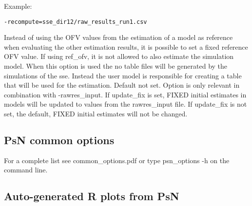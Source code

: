 \begin{optionlist}
Example:
\begin{verbatim}
-recompute=sse_dir12/raw_results_run1.csv
\end{verbatim}
\nextopt
{}
Instead of using the OFV values from the estimation of a model as reference when evaluating the other estimation results, it is possible to set a fixed reference OFV value. If using ref\_ofv, it is not allowed to also estimate the simulation model.
\nextopt
{}
When this option is used the no table files will be generated by
the simulations of the sse. Instead the user model is responsible for
creating a table that will be used for the estimation.
\nextopt
{}
Default not set. Option is only relevant in combination with -rawres\_input. If update\_fix is set, FIXED initial estimates in models will be updated to values from the rawres\_input file. If update\_fix is not set, the default, FIXED initial estimates will not be changed.
\end{optionlist}

\subsection{PsN common options}
For a complete list see common\_options.pdf or type psn\_options -h on the command line.

\subsection{Auto-generated R plots from PsN}
\newcommand{\rplotsconditions}{Parametric power estimation (PPE) allows to generate data for full power versus sample size curve(s) based on a sse with full and reduced models performed with a single sample size. The procedure is described in \cite{Ueckert}. The default sse template will perform all required PPE calculations in R and output the resulting power curve(s). For the template to work, the R libraries ggplot2 and plyr need to be installed. Furthermore, it is recommended 
to indicate the reduced model associated with a specific full model by adding the suffix `red' (i.e. `run1red.mod' is the reduced model associated with the full model `run1.mod'). If no full and reduced model pair with the expected naming scheme is found, matching will occur by position (i.e., estimation model 1 will be taken to be the full model and estimation model 2 the associated reduced model, same for 3 and 4, etc.).}



